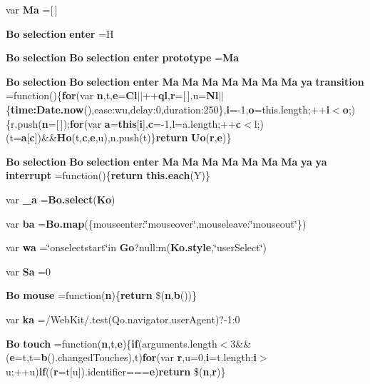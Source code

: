 \begin{DoxyCompactItemize}
\item 
var {\bf Ma} =[$\,$]
\item 
{\bf Bo} {\bf selection} {\bf enter} =H
\item 
{\bf Bo} {\bf selection} {\bf Bo} {\bf selection} {\bf enter} {\bf prototype} ={\bf Ma}
\item 
{\bf Bo} {\bf selection} {\bf Bo} {\bf selection} {\bf enter} {\bf Ma} {\bf Ma} {\bf Ma} {\bf Ma} {\bf Ma} {\bf Ma} {\bf Ma} {\bf ya} {\bf transition} =function()\{{\bf for}(var {\bf n},t,{\bf e}={\bf Cl}$\vert$$\vert$++{\bf ql},{\bf r}=[$\,$],u={\bf Nl}$\vert$$\vert$\{{\bf time\+:\+Date.\+now}(),ease\+:wu,delay\+:0,duration\+:250\},{\bf i}=-\/1,{\bf o}=this.\+length;++{\bf i}$<${\bf o};)\{r.\+push({\bf n}=[$\,$]);{\bf for}(var {\bf a}={\bf this}[{\bf i}],{\bf c}=-\/1,l=a.\+length;++{\bf c}$<$l;)(t={\bf a}[{\bf c}])\&\&{\bf Ho}(t,{\bf c},{\bf e},u),n.\+push(t)\}{\bf return} {\bf Uo}({\bf r},{\bf e})\}
\item 
{\bf Bo} {\bf selection} {\bf Bo} {\bf selection} {\bf enter} {\bf Ma} {\bf Ma} {\bf Ma} {\bf Ma} {\bf Ma} {\bf Ma} {\bf Ma} {\bf ya} {\bf ya} {\bf interrupt} =function()\{{\bf return} {\bf this.\+each}(Y)\}
\item 
var {\bf \+\_\+a} ={\bf Bo.\+select}({\bf Ko})
\item 
var {\bf ba} ={\bf Bo.\+map}(\{mouseenter\+:\char`\"{}mouseover\char`\"{},mouseleave\+:\char`\"{}mouseout\char`\"{}\})
\item 
var {\bf wa} =\char`\"{}onselectstart\char`\"{}in {\bf Go}?null\+:m({\bf Ko.\+style},\char`\"{}user\+Select\char`\"{})
\item 
var {\bf Sa} =0
\item 
{\bf Bo} {\bf mouse} =function({\bf n})\{{\bf return} \$({\bf n},{\bf b}())\}
\item 
var {\bf ka} =/Web\+Kit/.test(Qo.\+navigator.\+user\+Agent)?-\/1\+:0
\item 
{\bf Bo} {\bf touch} =function({\bf n},t,{\bf e})\{{\bf if}(arguments.\+length$<$3\&\&({\bf e}=t,t={\bf b}().changed\+Touches),t){\bf for}(var {\bf r},u=0,{\bf i}=t.\+length;{\bf i}$>$u;++u){\bf if}(({\bf r}=t[u]).identifier==={\bf e}){\bf return} \$({\bf n},{\bf r})\}
\item 

\end{DoxyCompactItemize}
